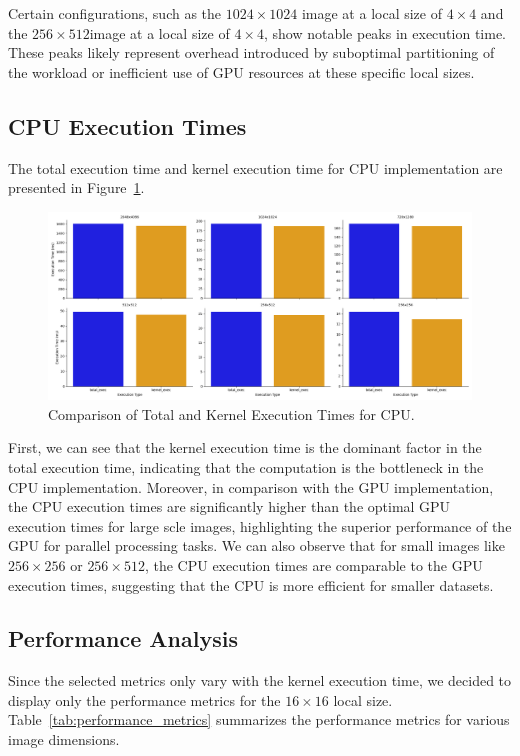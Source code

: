 \documentclass{article}
\begin{document}
Certain configurations, such as the \(1024 \times 1024\) image at a local size of \(4 \times 4\) and the \(256 \times 512\)image at a local size of \(4\times 4\), show notable peaks in execution time. These peaks likely represent overhead introduced by suboptimal partitioning of the workload or inefficient use of GPU resources at these specific local sizes.

\subsection*{CPU Execution Times}
The total execution time and kernel execution time for CPU implementation are presented in Figure~\ref{fig:cpu_exec}.

\begin{figure}[h!]
    \centering
    \includegraphics[width=\textwidth]{./images/cpu_exec.png}
    \caption{Comparison of Total and Kernel Execution Times for CPU.}
    \label{fig:cpu_exec}
\end{figure}

First, we can see that the kernel execution time is the dominant factor in the total execution time, indicating that the computation is the bottleneck in the CPU implementation. Moreover, in comparison with the GPU implementation, the CPU execution
times are significantly higher than the optimal GPU execution times for large scle images, highlighting the superior performance of the GPU for parallel processing tasks. We can also observe that for small images like \(256 \times 256\) or \(256 \times 512\), the CPU execution times are comparable to the GPU execution times, suggesting that the CPU is more efficient for smaller datasets.

\subsection*{Performance Analysis}
Since the selected metrics only vary with the kernel execution time, we decided to display only
the performance metrics for the \(16 \times 16\) local size. Table~\ref{tab:performance_metrics} summarizes the performance metrics for various image dimensions.
\end{document}
